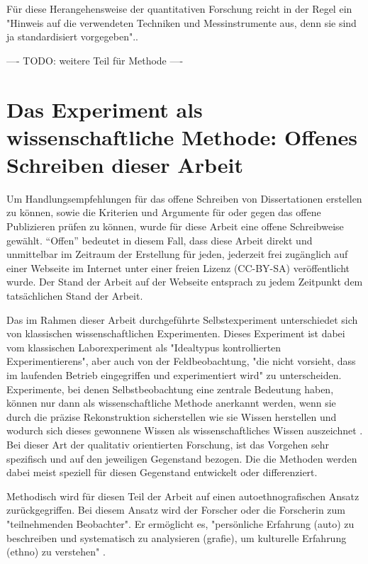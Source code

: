 Für diese Herangehensweise der quantitativen Forschung reicht in der Regel ein "Hinweis auf die verwendeten Techniken und Messinstrumente aus, denn sie sind ja standardisiert vorgegeben".\cite{Mayring_1999:119}.

---- TODO: weitere Teil für Methode ----

\section{Das Experiment als wissenschaftliche Methode: Offenes Schreiben dieser Arbeit}

Um Handlungsempfehlungen für das offene Schreiben von Dissertationen erstellen zu können, sowie die Kriterien und Argumente für oder gegen das offene Publizieren prüfen zu können, wurde für diese Arbeit eine offene Schreibweise gewählt. “Offen” bedeutet in diesem Fall, dass diese Arbeit direkt und unmittelbar im Zeitraum der Erstellung für jeden, jederzeit frei zugänglich auf einer Webseite im Internet unter einer freien Lizenz (CC-BY-SA) veröffentlicht wurde. Der Stand der Arbeit auf der Webseite entsprach zu jedem Zeitpunkt dem tatsächlichen Stand der Arbeit.

Das im Rahmen dieser Arbeit durchgeführte Selbstexperiment unterschiedet sich von klassischen wissenschaftlichen Experimenten. Dieses Experiment ist dabei vom klassischen Laborexperiment als "Idealtypus kontrollierten Experimentierens", aber auch von der Feldbeobachtung, "die nicht vorsieht, dass im laufenden Betrieb eingegriffen und experimentiert wird" \cite{FQS196} zu unterscheiden. Experimente, bei denen Selbstbeobachtung eine zentrale Bedeutung haben, können nur dann als wissenschaftliche Methode anerkannt werden, wenn sie durch die präzise Rekonstruktion sicherstellen wie sie Wissen herstellen und wodurch sich dieses gewonnene Wissen als wissenschaftliches Wissen auszeichnet \cite{solhdju_2011_selbstexperimente}. Bei dieser Art der qualitativ orientierten Forschung, ist das Vorgehen sehr spezifisch und auf den jeweiligen Gegenstand bezogen. Die die Methoden werden dabei meist speziell für diesen Gegenstand entwickelt oder differenziert\cite{Mayring_1999:119}.

Methodisch wird für diesen Teil der Arbeit auf einen autoethnografischen Ansatz zurückgegriffen. Bei diesem Ansatz wird der Forscher oder die Forscherin zum "teilnehmenden Beobachter"\cite{Ellis_2010}. Er ermöglicht es, "persönliche Erfahrung (auto) zu beschreiben und systematisch zu analysieren (grafie), um kulturelle Erfahrung (ethno) zu verstehen" \cite{Ellis_2010}.

